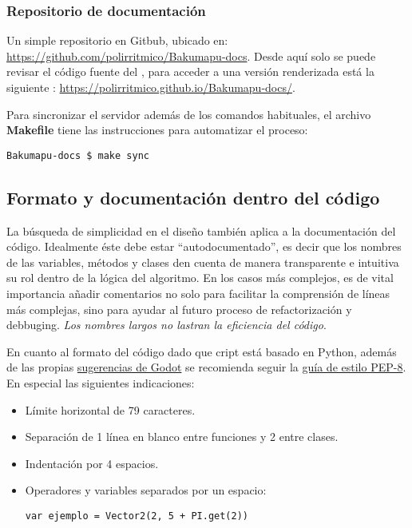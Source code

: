 \subsubsection{Repositorio de documentación}\label{flujo:repositorio-de-documentacion}
Un simple repositorio  en Gitbub, ubicado en: \url{https://github.com/polirritmico/Bakumapu-docs}. Desde aquí solo se puede revisar el código fuente del , para acceder a una versión renderizada está la siguiente : \url{https://polirritmico.github.io/Bakumapu-docs/}.

Para sincronizar el servidor además de los comandos  habituales, el archivo \textbf{Makefile} tiene las instrucciones para automatizar el proceso:
\begin{lstlisting}
Bakumapu-docs $ make sync
\end{lstlisting}


\subsection{Formato y documentación dentro del código}\label{flujo:documentacion-en-codigo}
La búsqueda de simplicidad en el diseño también aplica a la documentación del código. Idealmente éste debe estar “autodocumentado”, es decir que los nombres de las variables, métodos y clases den cuenta de manera transparente e intuitiva su rol dentro de la lógica del algoritmo. En los casos más complejos, es de vital importancia añadir comentarios no solo para facilitar la comprensión de líneas más complejas, sino para ayudar al futuro proceso de refactorización y debbuging. \emph{Los nombres largos no lastran la eficiencia del código}.

En cuanto al formato del código dado que cript está basado en Python, además de las propias \href{https://docs.godotengine.org/en/stable/getting_started/scripting/gdscript/gdscript_styleguide.html}{sugerencias de Godot} se recomienda seguir la \href{https://www.python.org/dev/peps/pep-0008/}{guía de estilo PEP-8}. En especial las siguientes indicaciones:

\begin{itemize}[noitemsep]
	\item Límite horizontal de 79 caracteres. 
	\item Separación de 1 línea en blanco entre funciones y 2 entre clases.
	\item Indentación por 4 espacios.
	\item Operadores y variables separados por un espacio:
	\begin{lstlisting}
var ejemplo = Vector2(2, 5 + PI.get(2))
	\end{lstlisting}
\end{itemize}


